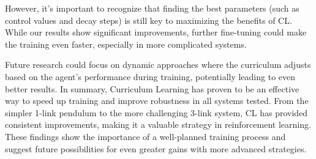 

However, it’s important to recognize that finding the best parameters (such as control values and decay steps) is still key to maximizing the benefits of CL. While our results show significant improvements, further fine-tuning could make the training even faster, especially in more complicated systems. 

Future research could focus on dynamic approaches where the curriculum adjusts based on the agent's performance during training, potentially leading to even better results.
In summary, Curriculum Learning has proven to be an effective way to speed up training and improve robustness in all systems tested. From the simpler 1-link pendulum to the more challenging 3-link system, CL has provided consistent improvements, making it a valuable strategy in reinforcement learning. These findings show the importance of a well-planned training process and suggest future possibilities for even greater gains with more advanced strategies.